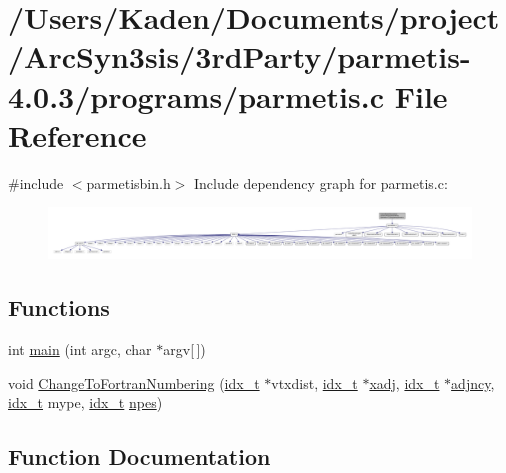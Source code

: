 \hypertarget{a00942}{}\section{/\+Users/\+Kaden/\+Documents/project/\+Arc\+Syn3sis/3rd\+Party/parmetis-\/4.0.3/programs/parmetis.c File Reference}
\label{a00942}
{\ttfamily \#include $<$parmetisbin.\+h$>$}\newline
Include dependency graph for parmetis.\+c\+:\nopagebreak
\begin{figure}[H]
\begin{center}
\leavevmode
\includegraphics[width=350pt]{a00943}
\end{center}
\end{figure}
\subsection*{Functions}
\begin{DoxyCompactItemize}
\item 
int \hyperlink{a00942_a0ddf1224851353fc92bfbff6f499fa97}{main} (int argc, char $\ast$argv\mbox{[}$\,$\mbox{]})
\item 
void \hyperlink{a00942_aa315eef946d443a492d289bbe64712ba}{Change\+To\+Fortran\+Numbering} (\hyperlink{a00876_aaa5262be3e700770163401acb0150f52}{idx\+\_\+t} $\ast$vtxdist, \hyperlink{a00876_aaa5262be3e700770163401acb0150f52}{idx\+\_\+t} $\ast$\hyperlink{a00879_aa8fc7f75458e38e1e2979ed6db639164}{xadj}, \hyperlink{a00876_aaa5262be3e700770163401acb0150f52}{idx\+\_\+t} $\ast$\hyperlink{a00879_a20c068e3ebdd8f9889fb82c1f677d679}{adjncy}, \hyperlink{a00876_aaa5262be3e700770163401acb0150f52}{idx\+\_\+t} mype, \hyperlink{a00876_aaa5262be3e700770163401acb0150f52}{idx\+\_\+t} \hyperlink{a00879_ae38a1cbfe208369db2829161d741da57}{npes})
\end{DoxyCompactItemize}


\subsection{Function Documentation}
\mbox{\label{a00942_aa315eef946d443a492d289bbe64712ba}} 
